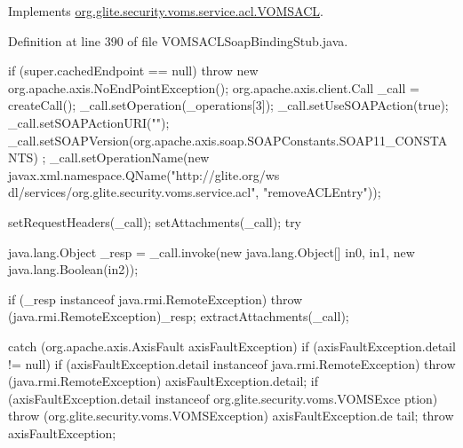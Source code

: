 \label{classorg_1_1glite_1_1security_1_1voms_1_1service_1_1acl_1_1VOMSACLSoapBindingStub_ab5df328ae62515a8ef7806eed3afe60a}


Implements \hyperlink{interfaceorg_1_1glite_1_1security_1_1voms_1_1service_1_1acl_1_1VOMSACL_a40be29686bada498297fa0bb6953f34a}{org.glite.security.voms.service.acl.VOMSACL}.



Definition at line 390 of file VOMSACLSoapBindingStub.java.


\begin{DoxyCode}
                                                                                 
                                                                                       
                               {
        if (super.cachedEndpoint == null) {
            throw new org.apache.axis.NoEndPointException();
        }
        org.apache.axis.client.Call _call = createCall();
        _call.setOperation(_operations[3]);
        _call.setUseSOAPAction(true);
        _call.setSOAPActionURI("");
        _call.setSOAPVersion(org.apache.axis.soap.SOAPConstants.SOAP11_CONSTANTS)
      ;
        _call.setOperationName(new javax.xml.namespace.QName("http://glite.org/ws
      dl/services/org.glite.security.voms.service.acl", "removeACLEntry"));

        setRequestHeaders(_call);
        setAttachments(_call);
 try {        java.lang.Object _resp = _call.invoke(new java.lang.Object[] {in0, 
      in1, new java.lang.Boolean(in2)});

        if (_resp instanceof java.rmi.RemoteException) {
            throw (java.rmi.RemoteException)_resp;
        }
        extractAttachments(_call);
  } catch (org.apache.axis.AxisFault axisFaultException) {
    if (axisFaultException.detail != null) {
        if (axisFaultException.detail instanceof java.rmi.RemoteException) {
              throw (java.rmi.RemoteException) axisFaultException.detail;
         }
        if (axisFaultException.detail instanceof org.glite.security.voms.VOMSExce
      ption) {
              throw (org.glite.security.voms.VOMSException) axisFaultException.de
      tail;
         }
   }
  throw axisFaultException;
}
    }
\end{DoxyCode}
